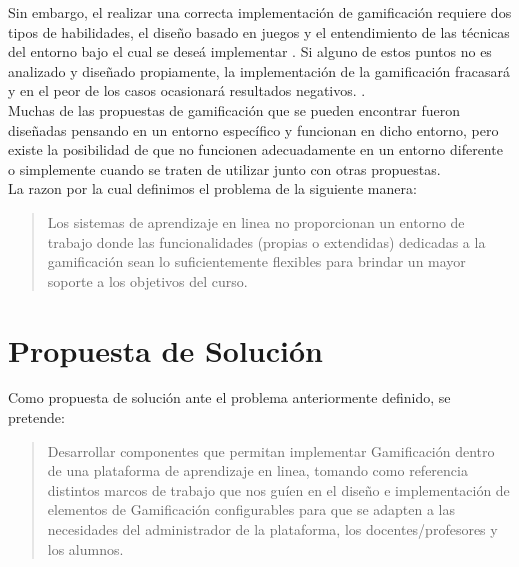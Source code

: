 \noindent Sin embargo, el realizar una correcta implementación de gamificación requiere dos tipos de habilidades, el diseño basado en juegos y el entendimiento de las técnicas del entorno bajo el cual se deseá implementar \cite[p. 7]{FrameWorkForTheWin}. Si alguno de estos puntos no es analizado y diseñado propiamente, la implementación de la gamificación fracasará y en el peor de los casos ocasionará resultados negativos. \cite{Wood-Reiners}.\\

\noindent Muchas de las propuestas de gamificación que se pueden encontrar fueron diseñadas pensando en un entorno específico y funcionan en dicho entorno, pero existe la posibilidad de que no funcionen adecuadamente en un entorno diferente o simplemente cuando se traten de utilizar junto con otras propuestas.\\

    \noindent La razon por la cual definimos el problema de la siguiente manera:

    \begin{quote}
    \colorbox{blue!05}{\parbox{\dimexpr\linewidth-2\fboxsep}{\strut%
        Los sistemas de aprendizaje en linea no proporcionan un entorno
        de trabajo donde las funcionalidades (propias o extendidas) dedicadas
        a la gamificación sean lo suficientemente flexibles para brindar un
        mayor soporte a los objetivos del curso.
    \strut}}%
    \end{quote}
    

\section{Propuesta de Solución}
\label{sec:propuesta}

    \noindent Como propuesta de solución ante el problema anteriormente definido, se pretende:
    
    \begin{quote}
    \colorbox{blue!05}{\parbox{\dimexpr\linewidth-2\fboxsep}{\strut%
        Desarrollar componentes que permitan implementar Gamificación dentro
        de una plataforma de aprendizaje en linea, tomando como referencia 
        distintos marcos de trabajo que nos guíen en el diseño e implementación
        de elementos de Gamificación configurables para que se adapten a las 
        necesidades del administrador de la plataforma, los docentes/profesores y 
        los alumnos.
    \strut}}%
    \end{quote}
    
